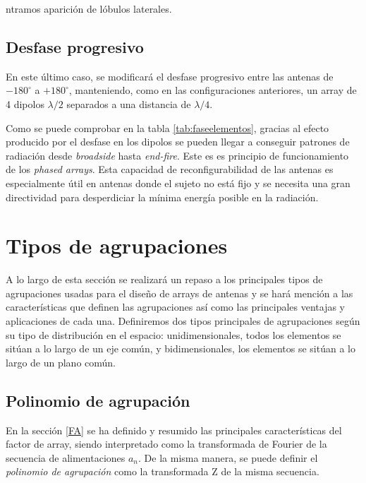 ntramos aparición de lóbulos laterales. \cite{Valero2008}






\subsection{Desfase progresivo}
\label{desfasprog}
\par En este último caso, se modificará el desfase progresivo entre las antenas de $-180^{\circ}$ a $+180^{\circ}$, manteniendo, como en las configuraciones anteriores, un array de 4 dipolos $\lambda/2$ separados a una distancia de $\lambda/4$. \cite{Valero2008}
\\
\par Como se puede comprobar en la tabla \ref{tab:faseelementos}, gracias al efecto producido por el desfase en los dipolos se pueden llegar a conseguir patrones de radiación desde \textit{broadside} hasta \textit{end-fire}. Este es es principio de funcionamiento de los \textit{phased arrays}. Esta capacidad de reconfigurabilidad de las antenas es especialmente útil en antenas donde el sujeto no está fijo y se necesita una gran directividad para desperdiciar la mínima energía posible en la radiación.



\newpage
\section{Tipos de agrupaciones}
\par A lo largo de esta sección se realizará un repaso a los principales tipos de agrupaciones usadas para el diseño de arrays de antenas y se hará mención a las características que definen las agrupaciones así como las principales ventajas y aplicaciones de cada una. Definiremos dos tipos principales de agrupaciones según su tipo de distribución en el espacio: unidimensionales, todos los elementos se sitúan a lo largo de un eje común, y bidimensionales, los elementos se sitúan a lo largo de un plano común.

\subsection{Polinomio de agrupación}
\par En la sección \ref{FA} se ha definido y resumido las principales características del factor de array, siendo interpretado como la transformada de Fourier de la secuencia de alimentaciones $a_{n}$. De la misma manera, se puede definir el \textit{polinomio de agrupación} como la transformada Z de la misma secuencia. \cite{Cardama2002}

